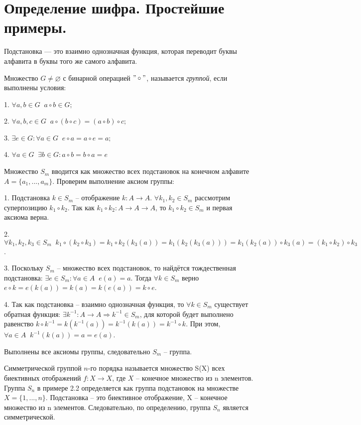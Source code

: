 \section{Определение шифра. Простейшие примеры.}

Подстановка — это взаимно однозначная функция, которая переводит буквы алфавита в буквы того же самого алфавита.

Множество $G \ne \varnothing$ с бинарной операцией $"\circ"$, называется \emph{группой}, если выполнены условия:

1. $ \forall a,b \in G \;\; a \circ b \in G; $

2. $ \forall a,b,c \in G \;\; a \circ (b \circ c) = (a \circ b) \circ c; $

3. $ \exists e \in G \colon \forall a \in G \;\; e \circ a = a \circ e = a;$

4. $ \forall a \in G \;\; \exists b \in G \colon a \circ b = b \circ a = e$

Множество $S_m$ вводится как множество всех подстановок на конечном алфавите $A = \{a_1, ... , a_m\} $. Проверим выполнение аксиом группы:

1. Подстановка $k \in S_m$ -- отображение $k \colon A \to A$. $\forall k_1, k_2 \in S_m $ рассмотрим суперпозицию $k_1 \circ k_2$. Так как $k_1 \circ k_2 \colon A \to A \to A$, то $k_1 \circ k_2 \in S_m $ и первая аксиома верна.

2. $\forall k_1, k_2, k_3 \in S_m \;\; k_1 \circ (k_2 \circ k_3) = k_1 \circ k_2 ( k_3 (a)) = k_1 ( k_2 ( k_3 (a))) = k_1 ( k_2 (a)) \circ k_3 (a) = (k_1 \circ k_2) \circ k_3$.

3. Поскольку $S_m$ -- множество всех подстановок, то найдётся тождественная подстановка: $\exists e \in S_m \colon \forall a \in A \;\; e(a) = a$. Тогда $\forall k \in S_m $ верно $e \circ k = e(k(a)) = k(a) = k(e(a)) = k \circ e$.

4. Так как подстановка -- взаимно однозначная функция, то $\forall k \in S_m $ существует обратная функция: $\exists k^{-1} \colon A \to A \Rightarrow k^{-1} \in S_m$, для которой будет выполнено равенство $k \circ k^{-1} = k (k^{-1}(a)) = k^{-1} (k(a)) = k^{-1} \circ k$. При этом, $\forall a \in A \;\; k^{-1} (k(a)) = a = e(a)$.

Выполнены все аксиомы группы, следовательно $S_m$ -- группа.

Симметрической группой $n$-го порядка называется множество S(X) всех биективных отображений $f \colon X \to X$, где $X$ -- конечное множество из n элементов.
Группа $S_n$ в примере 2.2 определяется как группа подстановок на множестве $X = \{1,...,n\}$. Подстановка -- это биективное отображение, X -- конечное множество из n элементов. Следовательно, по определению, группа $S_n$ является симметрической.


